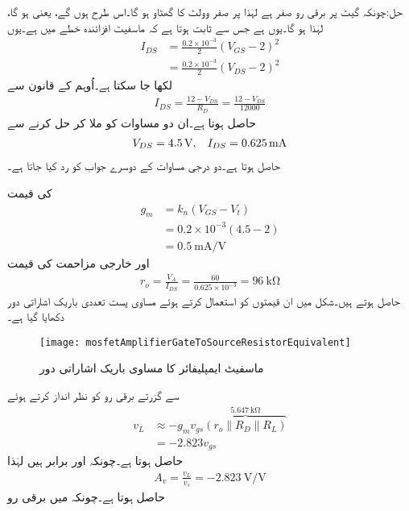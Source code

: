 حل:چونکہ گیٹ پر برقی رو صفر ہے لہٰذا  پر صفر وولٹ کا گھٹاو ہو گا۔اس طرح  ہوں گے، یعنی  ہو گا، لہٰذا  ہو گا۔یوں  ہے جس سے ثابت ہوتا ہے کہ ماسفیٹ افزائندہ خطے میں ہے۔یوں
\begin{align*}
I_{DS}&=\frac{0.2 \times 10^{-3}}{2} \left(V_{GS}-2 \right)^2\\
&=\frac{0.2 \times 10^{-3}}{2} \left(V_{DS}-2 \right)^2
\end{align*}
لکھا جا سکتا ہے۔اُوہم کے قانون سے
\begin{align*}
I_{DS}=\frac{12-V_{DS}}{R_D}=\frac{12-V_{DS}}{12000}
\end{align*}
حاصل ہوتا ہے۔ان دو مساوات کو ملا کر حل کرنے سے
\begin{align*}
V_{DS}=\SI{4.5}{\volt},\hspace{3mm} I_{DS}=\SI{0.625}{\milli \ampere}
\end{align*}
حاصل ہوتا ہے۔دو درجی مساوات کے دوسرے جواب کو رد کیا جاتا ہے۔

 کی قیمت
\begin{align*}
g_m&=k_n \left(V_{GS}-V_t \right)\\
&=0.2 \times 10^{-3} \left(4.5-2 \right)\\
&=\SI[per=frac,fraction=nice]{0.5}{\milli \ampere \per \volt}
\end{align*}
اور  خارجی مزاحمت  کی قیمت
\begin{align*}
r_o=\frac{V_A}{I_{DS}}=\frac{60}{0.625 \times 10^{-3}}=\SI{96}{\kilo \ohm}
\end{align*}
حاصل ہوتے ہیں۔شکل  میں ان قیمتوں کو استعمال کرتے ہوئے مساوی پست تعددی باریک اشاراتی  دور دکھایا گیا ہے۔
\begin{figure}
\centering
\texttt{[image: mosfetAmplifierGateToSourceResistorEquivalent]}
\caption{ماسفیٹ ایمپلیفائر کا مساوی باریک اشاراتی دور}
\label{شکل_ماسفیٹ_ایمپلیفائر_مساوی_باریک_اشاراتی_دور_مثال}
\end{figure}
 سے گزرتے برقی رو کو نظر انداز کرتے ہوئے
\begin{align*}
v_L& \approx -g_m v_{gs} \overbrace{\left(r_o \mathbin{\|} R_D \mathbin{\|} R_L \right)}^{\SI{5.647}{\kilo\ohm}}\\
&=-2.823 v_{gs}
\end{align*}
حاصل ہوتا ہے۔چونکہ  اور  برابر ہیں لہٰذا 
\begin{align*}
A_v=\frac{v_L}{v_s}=\SI[per=frac,fraction=nice]{-2.823}{\volt \per \volt}
\end{align*}
حاصل ہوتا ہے۔چونکہ  میں برقی رو

